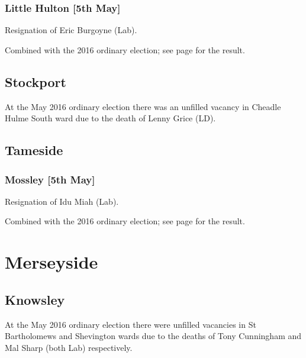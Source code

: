 \documentclass[a4paper,openany]{book}
\begin{document}
\begin{resultsiii}
\subsubsection*{Little Hulton \hspace*{\fill}\nolinebreak[1]%
\enspace\hspace*{\fill}
[5th May]}


Resignation of Eric Burgoyne (Lab).

Combined with the 2016 ordinary election; see page \pageref{LittleHultonSalford} for the result.

\subsection*{Stockport}

At the May 2016 ordinary election there was an unfilled vacancy in Cheadle Hulme South ward due to the death of Lenny Grice (LD).

\subsection*{Tameside}

\subsubsection*{Mossley \hspace*{\fill}\nolinebreak[1]%
\enspace\hspace*{\fill}
[5th May]}


Resignation of Idu Miah (Lab).

Combined with the 2016 ordinary election; see page \pageref{MossleyTameside} for the result.

\section{Merseyside}

\subsection*{Knowsley}

At the May 2016 ordinary election there were unfilled vacancies in St Bartholomews and Shevington wards due to the deaths of Tony Cunningham and Mal Sharp (both Lab) respectively.%
%


\end{resultsiii}
\end{document}
